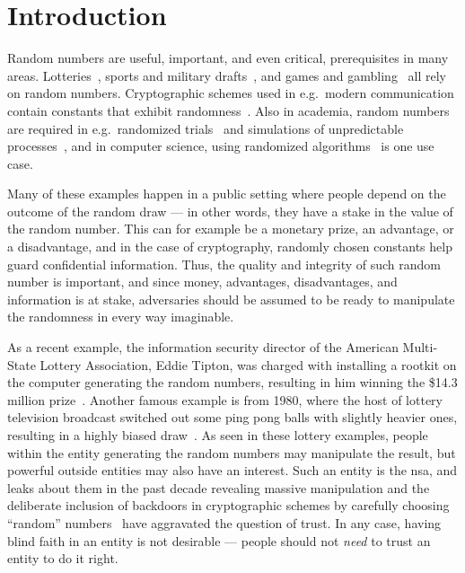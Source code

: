 \section{Introduction}\label{cha:introduction}

Random numbers are useful, important, and even critical, prerequisites in many areas.
Lotteries~\cite{grumbach2017distributed}, sports and military drafts~\cite{nbalottery, starr1997nonrandom}, and games and gambling~\cite{randomnumbersgames} all rely on random numbers.
Cryptographic schemes used in e.g.\ modern communication contain constants that exhibit randomness~\cite{baigneres2015trap}.
Also in academia, random numbers are required in e.g.\ randomized trials~\cite{kim2014random} and simulations of unpredictable processes~\cite{heath2002scientific}, and in computer science, using randomized algorithms~\cite{cormen2009introduction} is one use case.

Many of these examples happen in a public setting where people depend on the outcome of the random draw --- in other words, they have a stake in the value of the random number.
This can for example be a monetary prize, an advantage, or a disadvantage, and in the case of cryptography, randomly chosen constants help guard confidential information.
Thus, the quality and integrity of such random number is important, and since money, advantages, disadvantages, and information is at stake, adversaries should be assumed to be ready to manipulate the randomness in every way imaginable.

As a recent example, the information security director of the American Multi-State Lottery Association, Eddie Tipton, was charged with installing a rootkit on the computer generating the random numbers, resulting in him winning the \$14.3 million prize~\cite{lotteryscandal-eddietipton}.
Another famous example is from 1980, where the host of lottery television broadcast switched out some ping pong balls with slightly heavier ones, resulting in a highly biased draw~\cite{lotteryscandal-666}.
As seen in these lottery examples, people within the entity generating the random numbers may manipulate the result, but powerful outside entities may also have an interest.
Such an entity is the \gls{nsa}, and leaks about them in the past decade revealing massive manipulation and the deliberate inclusion of backdoors in cryptographic schemes by carefully choosing \enquote{random} numbers~\cite{nytimes-nsaconstants,nytimes-nsabackdoors} have aggravated the question of trust.
In any case, having blind faith in an entity is not desirable --- people should not \emph{need} to trust an entity to do it right.

